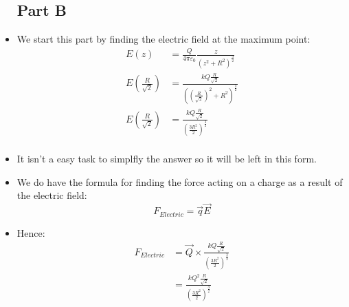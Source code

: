 \documentclass[10pt]{article}
\begin{document}
\begin{itemize}
\subsection{Part B}
\item We start this part by finding the electric field at the maximum point:
\begin{align*}
E(z)&=\frac{Q}{4 \pi \varepsilon_0}\frac{z}{(z^2+R^2)^{\frac{3}{2}}} \\
E \left ( \frac{R}{\sqrt{2}} \right )&=\frac{kQ  \frac{R}{\sqrt{2}}}{ \left ( \left(\frac{R}{\sqrt{2}} \right)^2+R^2 \right)^{\frac{3}{2}}} \\
E \left ( \frac{R}{\sqrt{2}} \right )&=\frac{kQ  \frac{R}{\sqrt{2}}}{ \left( \frac{3R^2}{2} \right)^{\frac{3}{2}}} \\
\end{align*}
\item It isn't a easy task to simplfly the answer so it will be left in this form.
\item We do have the formula for finding the force acting on a charge as a result of the electric field:
\begin{displaymath}
F_{Electric}=\vec{q}\vec{E}
\end{displaymath}
\item Hence:
\begin{align*}
F_{Electric}&=\vec{Q}\times \frac{kQ  \frac{R}{\sqrt{2}}}{ \left( \frac{3R^2}{2} \right)^{\frac{3}{2}}} \\
&= \frac{kQ^2  \frac{R}{\sqrt{2}}}{ \left( \frac{3R^2}{2} \right)^{\frac{3}{2}}} \\
\end{align*}
\pagebreak

\end{itemize}
\end{document}
